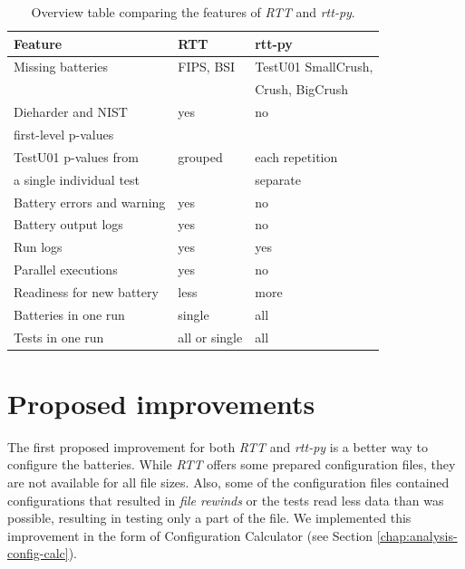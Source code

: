 \documentclass[
  digital,     %
  oneside,     %
  nosansbold,  %
  nocolorbold, %
  nolof,         %
  nolot,         %
]{fithesis4}
\begin{document}
\begin{table}[t]
  \begin{tabularx}{\textwidth}{l|l|l}
    Feature & RTT & rtt-py \\
    \midrule
    \midrule
    Missing batteries & FIPS, BSI & TestU01 SmallCrush, \\ %
     & & Crush, BigCrush \\
    \midrule
    Dieharder and NIST & yes & no \\ %
     first-level p-values & & \\
    \midrule
    TestU01 p-values from  & grouped & each repetition \\
     a single individual test  & &  separate \\
    \midrule
    Battery errors and warning & yes & no \\ %
    \midrule
    Battery output logs & yes & no \\ %
    \midrule
    Run logs & yes & yes \\
    \midrule
    Parallel executions & yes & no \\ %
    \midrule
    Readiness for new battery & less & more \\
    \midrule
    Batteries in one run & single & all \\
    \midrule
    Tests in one run & all or single & all \\
  \end{tabularx}
  \caption{Overview table comparing the features of \emph{RTT} and \emph{rtt-py}.}
  \label{tab:comparison}
\end{table}


\section{Proposed improvements}
The first proposed improvement for both \emph{RTT} and \emph{rtt-py} is a better way to configure the batteries. While \emph{RTT} offers some prepared configuration files, they are not available for all file sizes. Also, some of the configuration files contained configurations that resulted in \emph{file rewinds} or the tests read less data than was possible, resulting in testing only a part of the file. We implemented this improvement in the form of Configuration Calculator (see Section \ref{chap:analysis-config-calc}).
\end{document}
